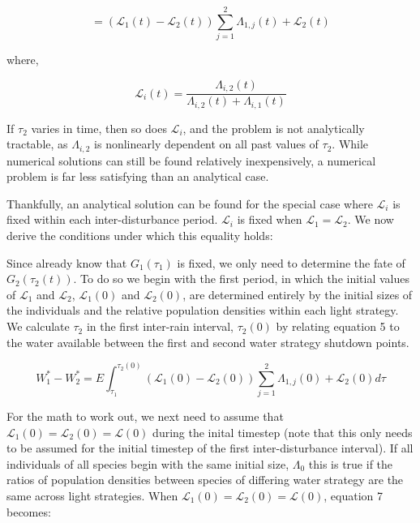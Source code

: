 \documentclass[11pt]{article}
\begin{document}
\begin{equation*}
     = (\mathcal{L}_1(t) - \mathcal{L}_2(t))\sum_{j=1}^2 \Lambda_{1,j}(t) + \mathcal{L}_2(t)
\end{equation*}

where,

\begin{equation}
    \mathcal{L}_i(t) = \frac{\Lambda_{i,2}(t)}{\Lambda_{i,2}(t) + \Lambda_{i,1}(t)}
\end{equation}

If \(\tau_2\) varies in time, then so does \(\mathcal{L}_i\), and the problem is not analytically tractable, as \(\Lambda_{i,2}\) is nonlinearly dependent on all past values of \(\tau_2\). While numerical solutions can still be found relatively inexpensively, a numerical problem is far less satisfying than an analytical case.

Thankfully, an analytical solution can be found for the special case where \(\mathcal{L}_i\) is fixed within each inter-disturbance period. \(\mathcal{L}_i\) is fixed when \(\mathcal{L}_1 = \mathcal{L}_2\). We now derive the conditions under which this equality holds:

Since already know that \(G_1(\tau_1)\) is fixed, we only need to determine the fate of \(G_2(\tau_2(t))\). To do so we begin with the first period, in which the initial values of \(\mathcal{L}_1\) and \(\mathcal{L}_2\), \(\mathcal{L}_1(0)\) and \(\mathcal{L}_2(0)\), are determined entirely by the initial sizes of the individuals and the relative population densities within each light strategy. We calculate \(\tau_2\) in the first inter-rain interval, \(\tau_2(0)\) by relating equation 5 to the water available between the first and second water strategy shutdown points.

\begin{equation}
   W^*_1 - W^*_2 = E \int_{\tau_1}^{\tau_2(0)} (\mathcal{L}_1(0) - \mathcal{L}_2(0))\sum_{j=1}^2 \Lambda_{1,j}(0) + \mathcal{L}_2(0) d\tau
\end{equation}

For the math to work out, we next need to assume that \(\mathcal{L}_1(0) = \mathcal{L}_2(0) = \mathcal{L}(0)\) during the inital timestep (note that this only needs to be assumed for the initial timestep of the first inter-disturbance interval). If all individuals of all species begin with the same initial size, \(\Lambda_0\) this is true if the ratios of population densities between species of differing water strategy are the same across light strategies. When \(\mathcal{L}_1(0) = \mathcal{L}_2(0) = \mathcal{L}(0)\), equation 7 becomes:
\end{document}
